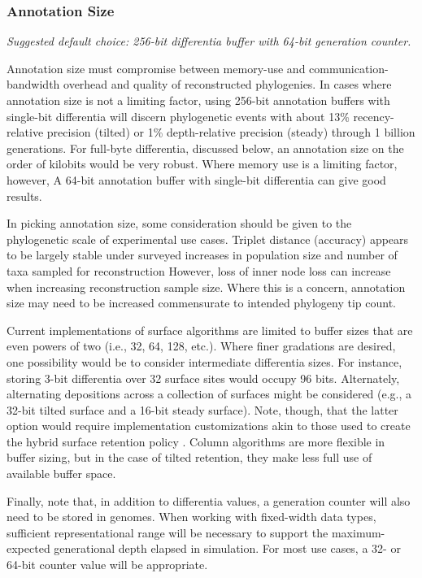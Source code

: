 \subsubsection{Annotation Size}
\textit{Suggested default choice: 256-bit differentia buffer with 64-bit generation counter.}

Annotation size must compromise between memory-use and communication-bandwidth overhead and quality of reconstructed phylogenies.
In cases where annotation size is not a limiting factor, using 256-bit annotation buffers with single-bit differentia will discern phylogenetic events with about 13\% recency-relative precision (tilted) or 1\% depth-relative precision (steady) through 1 billion generations.
For full-byte differentia, discussed below, an annotation size on the order of kilobits would be very robust.
Where memory use is a limiting factor, however, A 64-bit annotation buffer with single-bit differentia can give good results.

In picking annotation size, some consideration should be given to the phylogenetic scale of experimental use cases.
Triplet distance (accuracy) appears to be largely stable under surveyed increases in population size and number of taxa sampled for reconstruction
However, loss of inner node loss can increase when increasing reconstruction sample size.
Where this is a concern, annotation size may need to be increased commensurate to intended phylogeny tip count.

Current implementations of surface algorithms are limited to buffer sizes that are even powers of two (i.e., 32, 64, 128, etc.).
Where finer gradations are desired, one possibility would be to consider intermediate differentia sizes.
For instance, storing 3-bit differentia over 32 surface sites would occupy 96 bits.
Alternately, alternating depositions across a collection of surfaces might be considered (e.g., a 32-bit tilted surface and a 16-bit steady surface).
Note, though, that the latter option would require implementation customizations akin to those used to create the hybrid surface retention policy \citep{moreno2024hsurf}.
Column algorithms are more flexible in buffer sizing, but in the case of tilted retention, they make less full use of available buffer space.

Finally, note that, in addition to differentia values, a generation counter will also need to be stored in genomes.
When working with fixed-width data types, sufficient representational range will be necessary to support the maximum-expected generational depth elapsed in simulation.
For most use cases, a 32- or 64-bit counter value will be appropriate.

